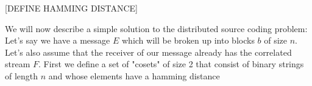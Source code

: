 \documentclass[11pt]{article}
\begin{document}
[DEFINE HAMMING DISTANCE]

We will now describe a simple solution to the distributed source coding problem: 
Let's say we have a message $E$ which will be broken up into blocks $b$ of size $n$. 
Let's also assume that the receiver of our message already has the correlated stream $F$. 
First we define a set of "cosets" of size 2 that consist of binary strings of length $n$ and 
whose elements have a hamming distance 



% 
% 

\end{document}
